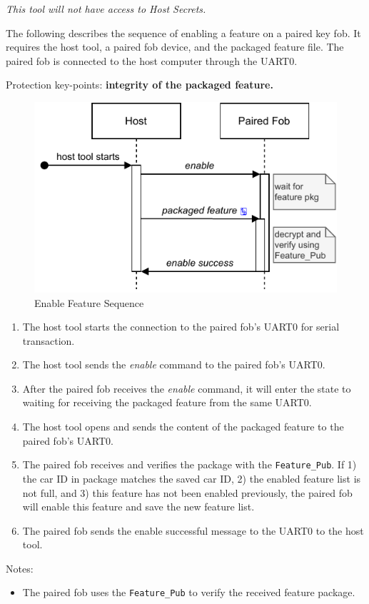 \documentclass[11pt,oneside,onecolumn,letterpaper]{article}
\begin{document}
\textit{This tool will not have access to Host Secrets.}

The following describes the sequence of enabling a feature on a paired key fob. It requires the host tool, a paired fob device, and the packaged feature file. The paired fob is connected to the host computer through the UART0.

Protection key-points: \textbf{integrity of the packaged feature.}

\begin{figure}[!htbp]
	\begin{centering}
		\includegraphics[width = .5\textwidth]{pic/enable.pdf}
		\caption{Enable Feature Sequence}
		\label{fig:enable}
	\end{centering}
\end{figure}

\begin{enumerate}
	\item The host tool starts the connection to the paired fob's UART0 for serial transaction.
	\item The host tool sends the \textit{enable} command to the paired fob's UART0.
	\item After the paired fob receives the \textit{enable} command, it will enter the state to waiting for receiving the packaged feature from the same UART0.
	\item The host tool opens and sends the content of the packaged feature to the paired fob's UART0.
	\item The paired fob receives and verifies the package with the \verb|Feature_Pub|. If 1) the car ID in package matches the saved car ID, 2) the enabled feature list is not full, and 3) this feature has not been enabled previously, the paired fob will enable this feature and save the new feature list.
	\item The paired fob sends the enable successful message to the UART0 to the host tool.
\end{enumerate}

Notes:
\begin{itemize}
	\item The paired fob uses the \verb|Feature_Pub| to verify the received feature package.
\end{itemize}
\end{document}
